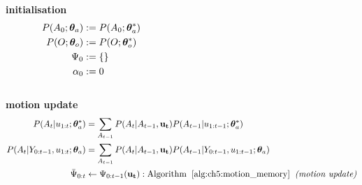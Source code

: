 \begin{appendices}
\begin{center}
\begin{minipage}{\linewidth}
\begin{algorithm}[H]
\label{alg:mrf-slam}
\nonl\hrulefill	
\BlankLine
\nonl\textbf{initialisation}\\
\vspace*{-0.5cm}
\nonl\begin{align}
P(A_0;\ThA) &:= P(A_0;\ThAs) \hspace*{6.5cm} \nonumber \\
P(O;\ThO) &:= P(O;\ThOs)\nonumber \\
\Psi_0 &:= \{\}\nonumber\\
\alpha_0 &:= 0 \nonumber
\end{align}
\vspace*{-1cm}
\BlankLine
\nonl\hrulefill	\\
\nonl\textbf{motion update}\\
\vspace*{-0.5cm}
\nonl\begin{align}
P(A_t|u_{1:t};\boldsymbol{\theta}^*_a)  	 	&= \sum\limits_{A_{t-1}} P(A_t|A_{t-1},\mathbf{u_t})  P(A_{t-1}|u_{1:t-1};\boldsymbol{\theta}^*_a) \nonumber \\
P(A_t|Y_{0:t-1},u_{1:t};\boldsymbol{\theta}_a) 	&= \sum\limits_{A_{t-1}} P(A_t|A_{t-1},\mathbf{u_t})  P(A_{t-1}|Y_{0:t-1},u_{1:t-1};\boldsymbol{\theta}_a) \nonumber \\
\bar{\Psi}_{0:t} 	 &\gets \Psi_{0:t-1}(\mathbf{u_t}): \mathrm{ Algorithm\;\; \ref{alg:ch5:motion_memory}\;\; \textit{(motion update)}} \nonumber
\end{align}
\vspace*{-1cm}

\end{algorithm}
\end{minipage}
\end{center}
\end{appendices}
